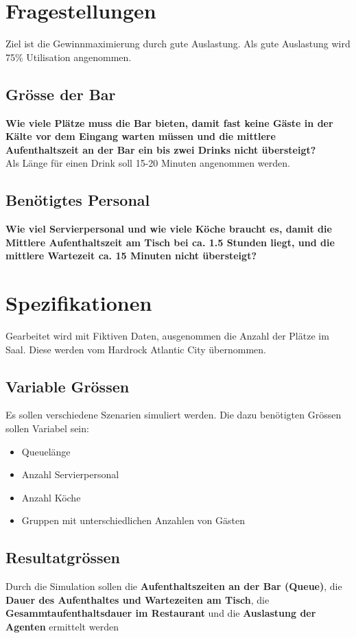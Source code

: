 \documentclass[ngerman,a4paper,12pt]{scrreprt}
\begin{document}
\section{Fragestellungen}
Ziel ist die Gewinnmaximierung durch gute Auslastung. Als gute Auslastung wird 75\% Utilisation angenommen.
\subsection{Grösse der Bar}
\textbf{Wie viele Plätze muss die Bar bieten, damit fast keine Gäste in der Kälte vor dem Eingang warten müssen und die mittlere Aufenthaltszeit an der Bar ein bis zwei Drinks nicht übersteigt?} \\
Als Länge für einen Drink soll 15-20 Minuten angenommen werden.


\subsection{Benötigtes Personal}
\textbf{Wie viel Servierpersonal und wie viele Köche braucht es, damit die Mittlere Aufenthaltszeit am Tisch bei ca. 1.5 Stunden liegt, und die mittlere Wartezeit ca. 15 Minuten nicht übersteigt?} \\


\section{Spezifikationen}
Gearbeitet wird mit Fiktiven Daten, ausgenommen die Anzahl der Plätze im Saal. Diese werden vom Hardrock Atlantic City übernommen.

\subsection{Variable Grössen}
Es sollen verschiedene Szenarien simuliert werden. Die dazu benötigten Grössen sollen Variabel sein:
\begin{itemize}
	\item Queuelänge
	\item Anzahl Servierpersonal
	\item Anzahl Köche
	\item Gruppen mit unterschiedlichen Anzahlen von Gästen
\end{itemize}

\subsection{Resultatgrössen}
Durch die Simulation sollen die \textbf{Aufenthaltszeiten an der Bar (Queue)}, die \textbf{Dauer des Aufenthaltes und Wartezeiten am Tisch}, die \textbf{Gesammtaufenthaltsdauer im Restaurant} und die \textbf{Auslastung der Agenten} ermittelt werden
\end{document}
